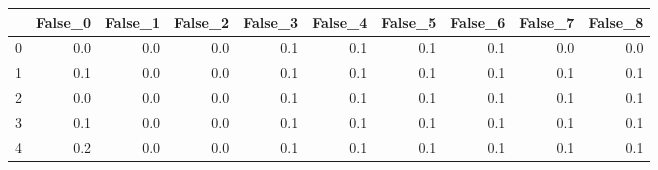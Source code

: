 \begin{tabular}{lrrrrrrrrr}
\toprule
{} &  False\_0 &  False\_1 &  False\_2 &  False\_3 &  False\_4 &  False\_5 &  False\_6 &  False\_7 &  False\_8 \\ \hline
\midrule
0 &      0.0 &      0.0 &      0.0 &      0.1 &      0.1 &      0.1 &      0.1 &      0.0 &      0.0 \\ \hline
1 &      0.1 &      0.0 &      0.0 &      0.1 &      0.1 &      0.1 &      0.1 &      0.1 &      0.1 \\ \hline
2 &      0.0 &      0.0 &      0.0 &      0.1 &      0.1 &      0.1 &      0.1 &      0.1 &      0.1 \\ \hline
3 &      0.1 &      0.0 &      0.0 &      0.1 &      0.1 &      0.1 &      0.1 &      0.1 &      0.1 \\ \hline
4 &      0.2 &      0.0 &      0.0 &      0.1 &      0.1 &      0.1 &      0.1 &      0.1 &      0.1 \\ \hline
\bottomrule
\end{tabular}
